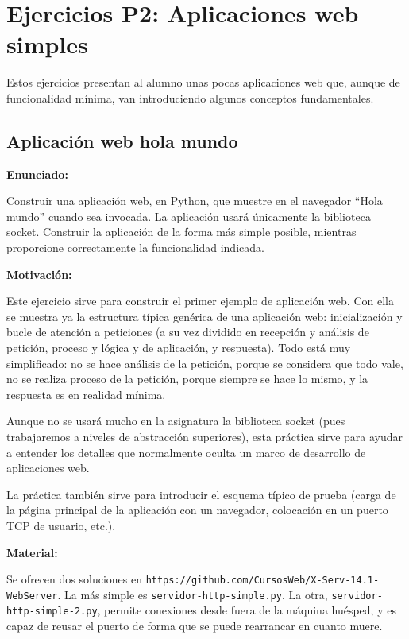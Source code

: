 \section{Ejercicios P2: Aplicaciones web simples}

Estos ejercicios presentan al alumno unas pocas aplicaciones web que, aunque de funcionalidad mínima, van introduciendo algunos conceptos fundamentales.

\subsection{Aplicación web hola mundo}
\label{subsec:aplweb-hola-mundo}

\textbf{Enunciado:}

Construir una aplicación web, en Python, que muestre en el navegador ``Hola mundo'' cuando sea invocada. La aplicación usará únicamente la biblioteca socket. Construir la aplicación de la forma más simple posible, mientras proporcione correctamente la funcionalidad indicada.

\textbf{Motivación:}

Este ejercicio sirve para construir el primer ejemplo de aplicación web. Con ella se muestra ya la estructura típica genérica de una aplicación web: inicialización y bucle de atención a peticiones (a su vez dividido en recepción y análisis de petición, proceso y lógica y de aplicación, y respuesta). Todo está muy simplificado: no se hace análisis de la petición, porque se considera que todo vale, no se realiza proceso de la petición, porque siempre se hace lo mismo, y la respuesta es en realidad mínima.

Aunque no se usará mucho en la asignatura la biblioteca socket (pues trabajaremos a niveles de abstracción superiores), esta práctica sirve para ayudar a entender los detalles que normalmente oculta un marco de desarrollo de aplicaciones web.

La práctica también sirve para introducir el esquema típico de prueba (carga de la página principal de la aplicación con un navegador, colocación en un puerto TCP de usuario, etc.).

\textbf{Material:}

Se ofrecen dos soluciones en \verb|https://github.com/CursosWeb/X-Serv-14.1-WebServer|. La más simple es \verb|servidor-http-simple.py|. La otra, \verb|servidor-http-simple-2.py|, permite conexiones desde fuera de la máquina huésped, y es capaz de reusar el puerto de forma que se puede rearrancar en cuanto muere.


